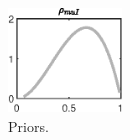 \begin{figure}[H]
\centering
\includegraphics[width=0.27\textwidth]{BRS_sectoral_wo_fixed_cost/graphs/BRS_sectoral_wo_fixed_cost_Priors4}
\caption{Priors.}\label{Fig:Priors:4}
\end{figure}
 
